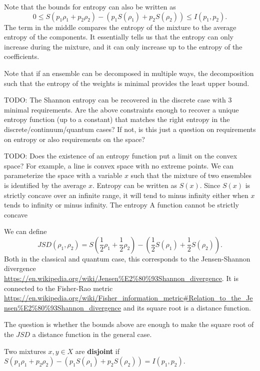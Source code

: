 \begin{remark}
	Note that the bounds for entropy can also be written as
	$$ 0 \leq S(p_1\rho_1 + p_2 \rho_2) - (p_1 S(\rho_1) + p_2 S(\rho_2)) \leq I(p_1, p_2).$$
	The term in the middle compares the entropy of the mixture to the average entropy of the components. It essentially tells us that the entropy can only increase during the mixture, and it can only increase up to the entropy of the coefficients.
	
	Note that if an ensemble can be decomposed in multiple ways, the decomposition such that the entropy of the weights is minimal provides the least upper bound.
	
	TODO: The Shannon entropy can be recovered in the discrete case with 3 minimal requirements. Are the above constraints enough to recover a unique entropy function (up to a constant) that matches the right entropy in the discrete/continuum/quantum cases? If not, is this just a question on requirements on entropy or also requirements on the space?
	
	TODO: Does the existence of an entropy function put a limit on the convex space? For example, a line is convex space with no extreme points. We can parameterize the space with a variable $x$ such that the mixture of two ensembles is identified by the average $x$. Entropy can be written as $S(x)$. Since $S(x)$ is strictly concave over an infinite range, it will tend to minus infinity either when $x$ tends to infinity or minus infinity. The entropy A function cannot be strictly concave 
\end{remark}

\begin{remark}
	We can define
	$$JSD(\rho_1, \rho_2) = S\left(\frac{1}{2}\rho_1 + \frac{1}{2} \rho_2\right) - \left(\frac{1}{2} S(\rho_1) + \frac{1}{2} S(\rho_2)\right).$$
	Both in the classical and quantum case, this corresponds to the Jensen-Shannon divergence \url{https://en.wikipedia.org/wiki/Jensen%E2%80%93Shannon_divergence}. It is connected to the Fisher-Rao metric \url{https://en.wikipedia.org/wiki/Fisher_information_metric#Relation_to_the_Jensen%E2%80%93Shannon_divergence} and its square root is a distance function.
	
	The question is whether the bounds above are enough to make the square root of the $JSD$ a distance function in the general case.
\end{remark}

\begin{defn}
	Two mixtures $x, y \in X$ are \textbf{disjoint} if $S(p_1\rho_1 + p_2 \rho_2) - (p_1 S(\rho_1) + p_2 S(\rho_2)) = I(p_1, p_2)$.
\end{defn}

